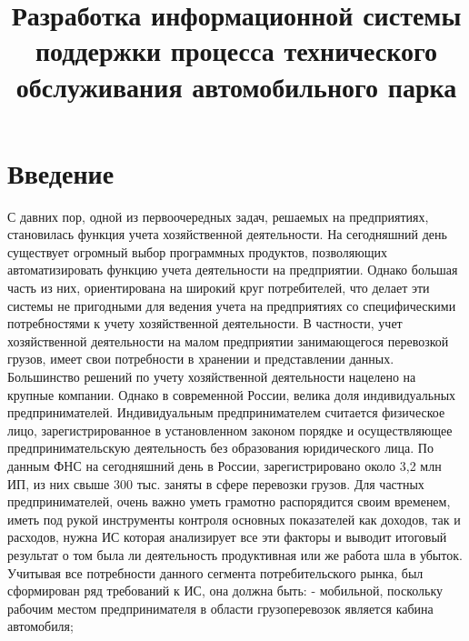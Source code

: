\documentclass{lstu-diploma}
\title{Разработка информационной системы поддержки процесса технического
обслуживания автомобильного парка}
\begin{document}
\maketitle
\chapter{Введение}
С давних пор, одной из первоочередных задач, решаемых на
предприятиях, становилась функция учета хозяйственной деятельности. На
сегодняшний день существует огромный выбор программных продуктов,
позволяющих автоматизировать функцию учета деятельности на
предприятии. Однако большая часть из них, ориентирована на широкий круг
потребителей, что делает эти системы не пригодными для ведения учета на
предприятиях со специфическими потребностями к учету хозяйственной
деятельности.
В частности, учет хозяйственной деятельности на малом предприятии
занимающегося перевозкой грузов, имеет свои потребности в хранении и
представлении данных. Большинство решений по учету хозяйственной
деятельности нацелено на крупные компании.
Однако в современной России, велика доля индивидуальных
предпринимателей. Индивидуальным предпринимателем считается
физическое лицо, зарегистрированное в установленном законом порядке и
осуществляющее предпринимательскую деятельность без образования
юридического лица. По данным ФНС на сегодняшний день в России,
зарегистрировано около 3,2 млн ИП, из них свыше 300 тыс. заняты в сфере
перевозки грузов.
Для частных предпринимателей, очень важно уметь грамотно
распорядится своим временем, иметь под рукой инструменты контроля
основных показателей как доходов, так и расходов, нужна ИС которая
анализирует все эти факторы и выводит итоговый результат о том была ли
деятельность продуктивная или же работа шла в убыток.
Учитывая все потребности данного сегмента потребительского рынка,
был сформирован ряд требований к ИС, она должна быть:
- мобильной, поскольку рабочим местом предпринимателя в
области грузоперевозок является кабина автомобиля;
\end{document}
